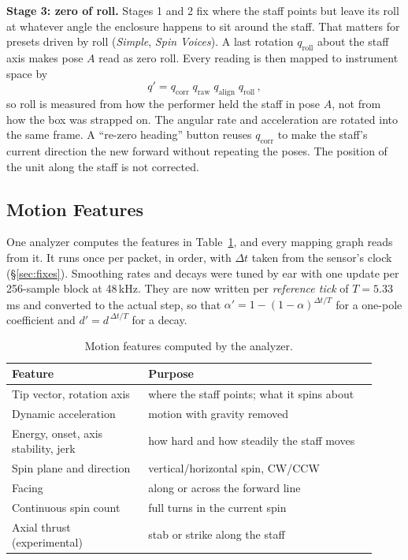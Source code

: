 \documentclass[sigconf,nonacm]{acmart}
\newcommand{\preset}[1]{\textit{#1}}
\begin{document}
\textbf{Stage 3: zero of roll.} Stages 1 and 2 fix where the staff points but leave its roll at
whatever angle the enclosure happens to sit around the staff. That matters for presets driven by
roll (\preset{Simple}, \preset{Spin Voices}). A last rotation $q_{\text{roll}}$ about the staff axis
makes pose $A$ read as zero roll. Every reading is then mapped to instrument space by
\[
q' = q_{\text{corr}}\; q_{\text{raw}}\; q_{\text{align}}\; q_{\text{roll}}\,,
\]
so roll is measured from how the performer held the staff in pose $A$, not from how the box was
strapped on. The angular rate and acceleration are rotated into the same frame. A ``re-zero
heading'' button reuses $q_{\text{corr}}$ to make the staff's current direction the new forward
without repeating the poses. The position of the unit along the staff is not corrected.

\subsection{Motion Features}
\label{sec:features}
One analyzer computes the features in Table~\ref{tab:motion-features}, and every mapping graph reads
from it. It runs once per packet, in order, with $\Delta t$ taken from the sensor's clock
(\S\ref{sec:fixes}). Smoothing rates and decays were tuned by ear with one update per 256-sample
block at 48\,kHz. They are now written per \emph{reference tick} of $T = 5.33$\,ms and converted to
the actual step, so that $\alpha' = 1-(1-\alpha)^{\Delta t/T}$ for a one-pole coefficient and
$d' = d^{\,\Delta t/T}$ for a decay.

\begin{table}[htbp]
\centering
\small
\caption{Motion features computed by the analyzer.}
\label{tab:motion-features}
\begin{tabular}{@{}p{0.34\linewidth}p{0.58\linewidth}@{}}
\toprule
Feature & Purpose \\
\midrule
Tip vector, rotation axis & where the staff points; what it spins about \\
Dynamic acceleration & motion with gravity removed \\
Energy, onset, axis stability, jerk & how hard and how steadily the staff moves \\
Spin plane and direction & vertical/horizontal spin, CW/CCW \\
Facing & along or across the forward line \\
Continuous spin count & full turns in the current spin \\
Axial thrust (experimental) & stab or strike along the staff \\
\bottomrule
\end{tabular}
\end{table}
\end{document}
